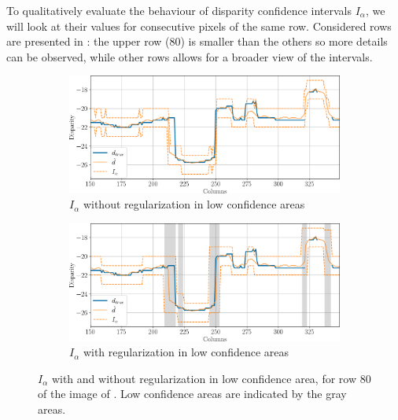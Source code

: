To qualitatively evaluate the behaviour of disparity confidence intervals $I_\alpha$, we will look at their values for consecutive pixels of the same row. Considered rows are presented in : the upper row ($80$) is smaller than the others so more details can be observed, while other rows allows for a broader view of the intervals.

\begin{figure}
    \centering
    \begin{subfigure}[t]{0.8\linewidth}
        \centering
        \includegraphics[width=\linewidth]{Images/Chap_5/intervals_ambiguous_area_row_80_1.png}
        \caption{$I_\alpha$ without regularization in low confidence areas}
        \label{fig:intervals_ambiguous_row_80_1}
    \end{subfigure}\hfill
    \begin{subfigure}[t]{0.8\linewidth}
        \centering
        \includegraphics[width=\linewidth]{Images/Chap_5/intervals_ambiguous_area_row_80_2.png}
        \caption{$I_\alpha$ with regularization in low confidence areas}
        \label{fig:intervals_ambiguous_row_80_2}
    \end{subfigure}
    \caption{$I_\alpha$ with and without regularization in low confidence area, for row $80$ of the image of . Low confidence areas are indicated by the gray areas.}
    \label{fig:intervals_ambiguous_row_80}
\end{figure}

